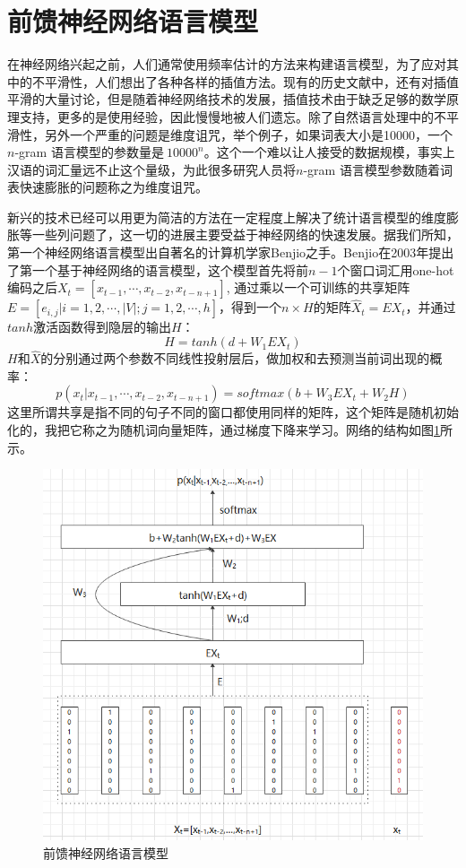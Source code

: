 \documentclass[twoside,a4paper,12pt]{book}%
\begin{document}
\section{前馈神经网络语言模型}
在神经网络兴起之前，人们通常使用频率估计的方法来构建语言模型，为了应对其中的不平滑性，人们想出了各种各样的插值方法。现有的历史文献中，还有对插值平滑的大量讨论，但是随着神经网络技术的发展，插值技术由于缺乏足够的数学原理支持，更多的是使用经验，因此慢慢地被人们遗忘。除了自然语言处理中的不平滑性，另外一个严重的问题是维度诅咒，举个例子，如果词表大小是10000，一个$n$-gram 语言模型的参数量是$~10000^n$。这个一个难以让人接受的数据规模，事实上汉语的词汇量远不止这个量级，为此很多研究人员将$n$-gram 语言模型参数随着词表快速膨胀的问题称之为维度诅咒。

新兴的技术已经可以用更为简洁的方法在一定程度上解决了统计语言模型的维度膨胀等一些列问题了，这一切的进展主要受益于神经网络的快速发展。据我们所知，第一个神经网络语言模型出自著名的计算机学家Benjio之手。Benjio在2003年提出了第一个基于神经网络的语言模型，这个模型首先将前$n-1$个窗口词汇用one-hot编码之后$X_t=[x_{t-1},\cdots,x_{t-2},x_{t-n+1}]$, 通过乘以一个可训练的共享矩阵$E=[e_{i,j}|i=1,2,\cdots,|V|;j=1,2,\cdots,h]$，得到一个$n \times H$的矩阵$\hat X_t=EX_t$，并通过$tanh$激活函数得到隐层的输出$H$：
$$
H = tanh(d + W_1EX_t)
$$
$H$和$\hat X$的分别通过两个参数不同线性投射层后，做加权和去预测当前词出现的概率：
$$
p(x_t|x_{t-1},\cdots,x_{t-2},x_{t-n+1}) = softmax(b+W_3EX_t+W_2H) 
$$
这里所谓共享是指不同的句子不同的窗口都使用同样的矩阵，这个矩阵是随机初始化的，我把它称之为随机词向量矩阵，通过梯度下降来学习。网络的结构如图\ref{fig:nnlm}所示。

\begin{figure}[h]
\begin{center}
\includegraphics[width=5.5in]{figures/nnlm.png}
\caption{前馈神经网络语言模型} \label{fig:nnlm}
\end{center}
\end{figure}
\end{document}
